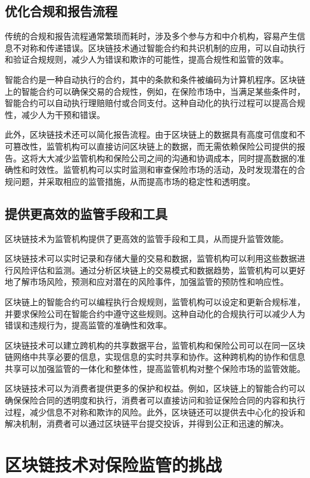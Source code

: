 \documentclass[a4paper,12pt]{ctexart}
\begin{document}
\subsection{优化合规和报告流程}
传统的合规和报告流程通常繁琐而耗时，涉及多个参与方和中介机构，容易产生信息不对称和传递错误。区块链技术通过智能合约和共识机制的应用，可以自动执行和验证合规规则，减少人为错误和欺诈的可能性，提高合规性和监管的效率。

智能合约是一种自动执行的合约，其中的条款和条件被编码为计算机程序。区块链上的智能合约可以确保交易的合规性，例如，在保险市场中，当满足某些条件时，智能合约可以自动执行理赔赔付或合同支付。这种自动化的执行过程可以提高合规性，减少人为干预和错误。

此外，区块链技术还可以简化报告流程。由于区块链上的数据具有高度可信度和不可篡改性，监管机构可以直接访问区块链上的数据，而无需依赖保险公司提供的报告。这将大大减少监管机构和保险公司之间的沟通和协调成本，同时提高数据的准确性和时效性。监管机构可以实时监测和审查保险市场的活动，及时发现潜在的合规问题，并采取相应的监管措施，从而提高市场的稳定性和透明度。

\subsection{提供更高效的监管手段和工具}
区块链技术为监管机构提供了更高效的监管手段和工具，从而提升监管效能。

区块链技术可以实时记录和存储大量的交易和数据，监管机构可以利用这些数据进行风险评估和监测。通过分析区块链上的交易模式和数据趋势，监管机构可以更好地了解市场风险，预测和应对潜在的风险事件，加强监管的预防性和响应性。

区块链上的智能合约可以编程执行合规规则，监管机构可以设定和更新合规标准，并要求保险公司在智能合约中遵守这些规则。这种自动化的合规执行可以减少人为错误和违规行为，提高监管的准确性和效率。

区块链技术可以建立跨机构的共享数据平台，监管机构和保险公司可以在同一区块链网络中共享必要的信息，实现信息的实时共享和协作。这种跨机构的协作和信息共享可以加强监管的一体化和整体性，提高监管机构对整个保险市场的监管效能。

区块链技术可以为消费者提供更多的保护和权益。例如，区块链上的智能合约可以确保保险合同的透明度和执行，消费者可以直接访问和验证保险合同的内容和执行过程，减少信息不对称和欺诈的风险。此外，区块链还可以提供去中心化的投诉和解决机制，消费者可以通过区块链平台提交投诉，并得到公正和迅速的解决。

\section{区块链技术对保险监管的挑战}
\end{document}

